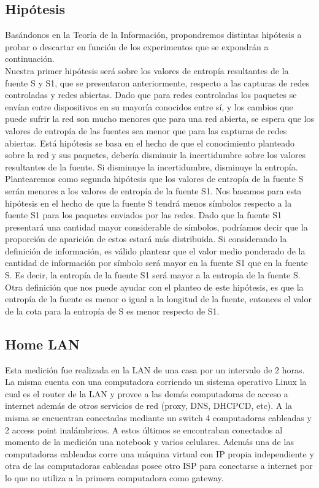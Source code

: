 \documentclass[final,inline,narroweqnarray,a4paper]{ieee}
\begin{document}
\subsection{Hipótesis}
Basándonos en la Teoría de la Información, propondremos distintas hipótesis a probar o descartar en función de los experimentos que se expondrán a continuación.\\
Nuestra primer hipótesis será sobre los valores de entropía resultantes de la fuente S y S{\scriptsize 1}, que se presentaron anteriormente, respecto a las capturas de redes controladas y redes abiertas. Dado que para redes controladas los paquetes se envían entre dispositivos en su mayoría conocidos entre sí, y los cambios que puede sufrir la red son mucho menores que para una red abierta, se espera que los valores de entropía de las fuentes sea menor que para las capturas de redes abiertas. Está hipótesis se basa en el hecho de que el conocimiento planteado sobre la red y sus paquetes, debería disminuir la incertidumbre sobre los valores resultantes de la fuente. Si disminuye la incertidumbre, disminuye la entropía.\\
Plantearemos como segunda hipótesis que los valores de entropía de la fuente S serán menores a los valores de entropía de la fuente S{\scriptsize 1}. Nos basamos para esta hipótesis en el hecho de que la fuente S tendrá menos símbolos respecto a la fuente S{\scriptsize 1} para los paquetes enviados por las redes. Dado que la fuente S{\scriptsize 1} presentará una cantidad mayor considerable de símbolos, podríamos decir que la proporción de aparición de estos estará más distribuida. Si considerando la definición de información, es válido plantear que el valor medio ponderado de la cantidad de información por símbolo será mayor en la fuente S{\scriptsize 1} que en la fuente S. Es decir, la entropía de la fuente S{\scriptsize 1} será mayor a la entropía de la fuente S. Otra definición que nos puede ayudar con el planteo de este hipótesis, es que la entropía de la fuente es menor o igual a la longitud de la fuente, entonces el valor de la cota para la entropía de S es menor respecto de S{\scriptsize 1}.

\subsection{Home LAN}

Esta medición fue realizada en la LAN de una casa por un intervalo de 2 horas. La misma cuenta con una computadora corriendo un sistema operativo Linux la cual es el router de la LAN y provee a las demás computadoras de acceso a internet además de otros servicios de red (proxy, DNS, DHCPCD, etc). A la misma se encuentran conectadas mediante un switch 4 computadoras cableadas y 2 access point inalámbricos. A estos últimos se encontraban conectados al momento de la medición una notebook y varios celulares. Además una de las computadoras cableadas corre una máquina virtual con IP propia independiente y otra de las computadoras cableadas posee otro ISP para conectarse a internet por lo que no utiliza a la primera computadora como gateway.
\end{document}
